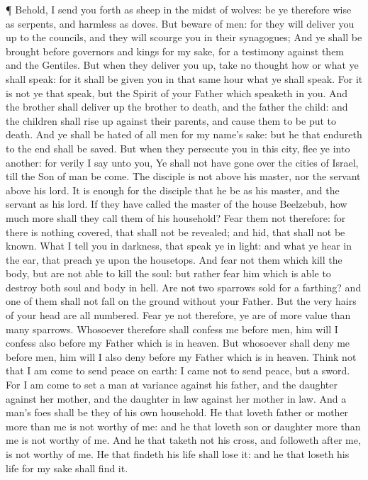  ¶ Behold, I send you forth as sheep in the midst of
wolves: be ye therefore wise as serpents, and harmless as doves.
 But beware of men: for they will deliver you up to the
councils, and they will scourge you in their synagogues; 
And ye shall be brought before governors and kings for my sake, for a
testimony against them and the Gentiles.  But when they
deliver you up, take no thought how or what ye shall speak: for it shall
be given you in that same hour what ye shall speak.  For it
is not ye that speak, but the Spirit of your Father which speaketh in
you.  And the brother shall deliver up the brother to
death, and the father the child: and the children shall rise up against
their parents, and cause them to be put to death.  And ye
shall be hated of all men for my name's sake: but he that endureth to
the end shall be saved.  But when they persecute you in
this city, flee ye into another: for verily I say unto you, Ye shall not
have gone over the cities of Israel, till the Son of man be come.
 The disciple is not above his master, nor the servant
above his lord.  It is enough for the disciple that he be
as his master, and the servant as his lord. If they have called the
master of the house Beelzebub, how much more shall they call them of his
household?  Fear them not therefore: for there is nothing
covered, that shall not be revealed; and hid, that shall not be known.
 What I tell you in darkness, that speak ye in light: and
what ye hear in the ear, that preach ye upon the housetops.
 And fear not them which kill the body, but are not able to
kill the soul: but rather fear him which is able to destroy both soul
and body in hell.  Are not two sparrows sold for a
farthing? and one of them shall not fall on the ground without your
Father.  But the very hairs of your head are all numbered.
 Fear ye not therefore, ye are of more value than many
sparrows.  Whosoever therefore shall confess me before men,
him will I confess also before my Father which is in heaven.
 But whosoever shall deny me before men, him will I also
deny before my Father which is in heaven.  Think not that I
am come to send peace on earth: I came not to send peace, but a sword.
 For I am come to set a man at variance against his father,
and the daughter against her mother, and the daughter in law against her
mother in law.  And a man's foes shall be they of his own
household.  He that loveth father or mother more than me is
not worthy of me: and he that loveth son or daughter more than me is not
worthy of me.  And he that taketh not his cross, and
followeth after me, is not worthy of me.  He that findeth
his life shall lose it: and he that loseth his life for my sake shall
find it.

